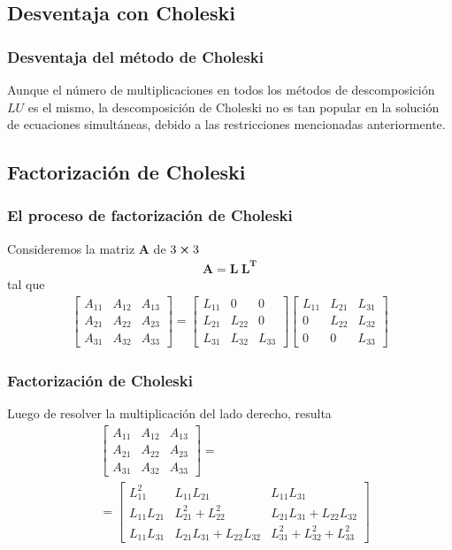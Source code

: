 \subsection*{Desventaja con Choleski}
\begin{frame}
\frametitle{Desventaja del método de Choleski}
Aunque el número de multiplicaciones en todos los métodos de descomposición $LU$ es el mismo, la descomposición de Choleski no es tan popular en la solución de ecuaciones simultáneas, debido a las restricciones mencionadas anteriormente.
\end{frame}
\subsection{Factorización de Choleski}
\begin{frame}
\frametitle{El proceso de factorización de Choleski}
Consideremos la matriz $\mathbf{A}$ de $3 \cp 3$
\begin{align*}
\mathbf{A = L \: L^{T}}
\end{align*}
tal que
\begin{align*}
\begin{bmatrix}
A_{11} & A_{12} & A_{13} \\
A_{21} & A_{22} & A_{23} \\
A_{31} & A_{32} & A_{33}
\end{bmatrix}
= \begin{bmatrix}
L_{11} & 0      & 0 \\
L_{21} & L_{22} & 0 \\
L_{31} & L_{32} & L_{33}
\end{bmatrix}
\begin{bmatrix}
L_{11} & L_{21} & L_{31} \\
0      & L_{22} & L_{32} \\
0      & 0      & L_{33}
\end{bmatrix}
\end{align*}
\end{frame}
\begin{frame}[fragile]
\frametitle{Factorización de Choleski}
Luego de resolver la multiplicación del lado derecho, resulta
\fontsize{12}{12}\selectfont
\begin{align*}
&\begin{bmatrix}
A_{11} & A_{12} & A_{13} \\
A_{21} & A_{22} & A_{23} \\
A_{31} & A_{32} & A_{33}
\end{bmatrix} = \\
&=
\begin{bmatrix}
L_{11}^{2} & L_{11}L_{21} & L_{11}L_{31} \\
L_{11}L_{21} & L_{21}^{2} + L_{22}^{2} & L_{21}L_{31} + L_{22}L_{32} \\
L_{11}L_{31} & L_{21}L_{31} + L_{22}L_{32} & L_{31}^{2} + L_{32}^{2} + L_{33}^{2}
\end{bmatrix}
\end{align*}
\end{frame}
